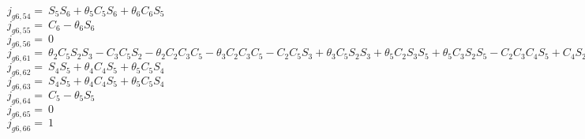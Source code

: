 \begin{appendices}
$j_{g6,54} =\  S_5S_6 + \theta _5C_5S_6 + \theta _6C_6S_5$\\
$j_{g6,55} =\  C_6 - \theta _6S_6$\\
$j_{g6,56} =\  0$\\
$j_{g6,61} =\  \theta _2C_5S_2S_3 - C_3C_5S_2 - \theta _2C_2C_3C_5 - \theta _3C_2C_3C_5 - C_2C_5S_3 + \theta _3C_5S_2S_3 + \theta _5C_2S_3S_5 + \theta _5C_3S_2S_5 - C_2C_3C_4S_5 + C_4S_2S_3S_5 - \theta _5C_2C_3C_4C_5 + \theta _2C_2C_4S_3S_5 + \theta _2C_3C_4S_2S_5 + \theta _3C_2C_4S_3S_5 + \theta _3C_3C_4S_2S_5 + \theta _4C_2C_3S_4S_5 + \theta _5C_4C_5S_2S_3 - \theta _4S_2S_3S_4S_5$\\
$j_{g6,62} =\  S_4S_5 + \theta _4C_4S_5 + \theta _5C_5S_4$\\
$j_{g6,63} =\  S_4S_5 + \theta _4C_4S_5 + \theta _5C_5S_4$\\
$j_{g6,64} =\  C_5 - \theta _5S_5$\\
$j_{g6,65} =\  0$\\
$j_{g6,66} =\  1$\\
\end{appendices}